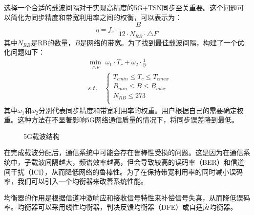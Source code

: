 \documentclass[UTF8,a4paper,12pt]{ctexart}
\numberwithin{equation}{section}
\begin{document}
选择一个合适的载波间隔对于实现高精度的5G+TSN同步至关重要。这个问题可以简化为同步精度和带宽利用率之间的权衡，可以表示为：
\begin{equation}
	\eta=f_c\cdot \frac{B}{12\cdot N_{RB}\cdot \triangle F}
\end{equation}
其中$N_{RB}$是RB的数量，$B$是网络的带宽。为了找到最佳载波间隔，构建了一个优化问题如下：
\begin{equation}
	\begin{split}
		&\min_{\triangle F} \,\, \omega_1 \cdot T_c+\omega_2 \cdot \frac{1}{\eta} \\
		&s.t.\quad  \left\{\begin{array}{lc}
			T_{cmin}\leq T_c \leq T_{cmax}\\
			B_{min}\leq B \leq B_{max}\\
			N_{RB}\leq 273\\
		\end{array}\right.
	\end{split}
\end{equation}
其中$\omega_1$和$\omega_2$分别代表同步精度和带宽利用率的权重。用户根据自己的需要确定权重。这种方法在不显著影响5G网络通信质量的情况下，将同步误差降到最低。
\begin{figure}[htb] 
	\caption{5G载波结构}
\end{figure}
在完成载波分配后，通信系统中可能会存在鲁棒性受损的问题。这是因为在通信系统中，子载波间隔越大，频谱效率越高，但会导致较高的误码率（BER）和信道间干扰（ICI），从而降低网络的鲁棒性。为了在保持带宽利用率的同时减小误码率，我们可以引入一个均衡器来改善系统性能。

均衡器的作用是根据信道冲激响应和接收信号特性来补偿信号失真，从而降低误码率。均衡器可以采用线性均衡器，判决反馈均衡器（DFE）或自适应均衡器。
\end{document}
